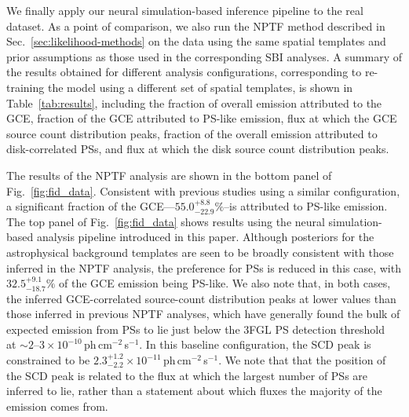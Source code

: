 \documentclass[prd,aps,10pt,nofootinbib,twocolumn,superscriptaddress,preprintnumbers,balancelastpage,longbibliography]{revtex4-1}
\begin{document}
We finally apply our neural simulation-based inference pipeline to the real \Fermi dataset. As a point of comparison, we also run the NPTF method described in Sec.~\ref{sec:likelihood-methods} on the data using the same spatial templates and prior assumptions as those used in the corresponding SBI analyses. A summary of the results obtained for different analysis configurations, corresponding to re-training the model using a different set of spatial templates, is shown in Table~\ref{tab:results}, including the fraction of overall emission attributed to the GCE, fraction of the GCE attributed to PS-like emission, flux at which the GCE source count distribution peaks, fraction of the overall emission attributed to disk-correlated PSs, and flux at which the disk source count distribution peaks.

The results of the NPTF analysis are shown in the bottom panel of Fig.~\ref{fig:fid_data}. Consistent with previous studies using a similar configuration, a significant fraction of the GCE---$55.0^{+8.8}_{-22.9}\%$--is attributed to PS-like emission.
The top panel of Fig.~\ref{fig:fid_data} shows results using the neural simulation-based analysis pipeline introduced in this paper. Although posteriors for the astrophysical background templates are seen to be broadly consistent with those inferred in the NPTF analysis, the preference for PSs is reduced in this case, with $32.5^{+9.1}_{-18.7}\%$ of the GCE emission being PS-like. We also note that, in both cases, the inferred GCE-correlated source-count distribution peaks at lower values than those inferred in previous NPTF analyses, which have generally found the bulk of expected emission from PSs to lie just below the 3FGL PS detection threshold~\cite{Lee:2015fea} at $\sim2$--$3\times 10^{-10}$\,ph\,cm$^{-2}$\,s$^{-1}$. In this baseline configuration, the SCD peak is constrained to be $2.3^{+1.2}_{-2.2}\times 10^{-11}$\,ph\,cm$^{-2}$\,s$^{-1}$. We note that that the position of the SCD peak is related to the flux at which the largest number of PSs are inferred to lie, rather than a statement about which fluxes the majority of the emission comes from.
\end{document}
